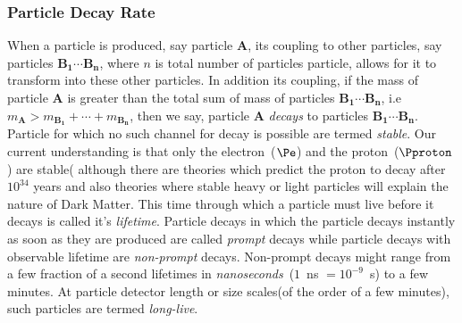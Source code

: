 {\subsubsection{Particle Decay Rate}
When a particle is produced, say particle $\mathbf{A}$, its coupling to other particles, say particles
 $\mathbf{B_{1}}\cdots \mathbf{B_{n}}$, where $n$ is total number of particles particle, 
allows for it to transform into these other particles. 
In addition its coupling, if the mass of particle $\mathbf{A}$ is greater than
the total sum of mass of particles $\mathbf{B_{1}}\cdots \mathbf{B_{n}}$, i.e $m_{\mathbf{A}} > m_{\mathbf{B_{1}}} + \cdots 
+ m_{\mathbf{B_{n}}}$, then we say, particle $\mathbf{A}$ \textit{decays} to particles $\mathbf{B_{1}}\cdots \mathbf{B_{n}}$.
Particle for which no such channel for decay is possible are termed \textit{stable}. Our current understanding is that
only the electron~($\Pe$) and the proton~($\Pproton$) are stable( although there are theories which predict the
proton to decay after $10^{34}$ years and also theories where stable heavy or light particles 
will explain the nature of Dark Matter. This time through which a particle must live before
it decays is called it's \textit{lifetime}. Particle decays in which the particle decays instantly as soon as they are produced
are called \textit{prompt} decays while particle decays with observable lifetime are \textit{non-prompt} decays.
Non-prompt decays might range from a few fraction of a second lifetimes in \textit{nanoseconds}~($1$~ns $= 10^{-9}$~s) to
a few minutes. At particle detector length or size scales(of the order of a few minutes), such particles are termed
\textit{long-live}.  
}
